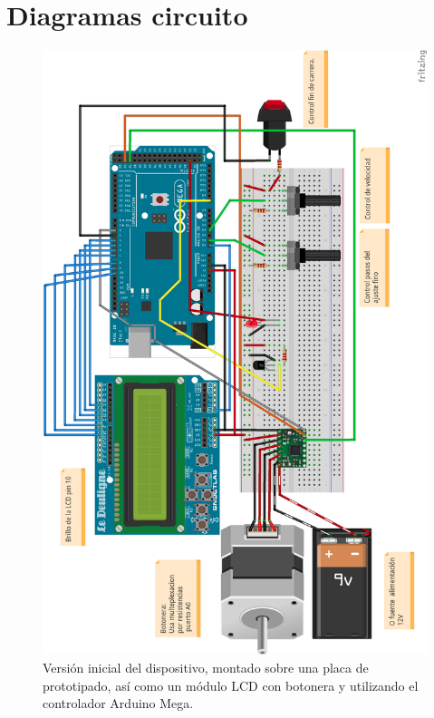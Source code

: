 \chapter{Diagramas circuito}
\label{ap:diagramas}

\begin{figure}[h]
	\centering
	\includegraphics[width=1.0\textwidth]{../images/circuito1}
	\caption[Versión 0 del dispositivo]{Versión inicial del dispositivo, montado sobre una placa de prototipado, así como un módulo LCD con botonera y utilizando el controlador Arduino Mega.}
	\label{circuito1}
\end{figure}



